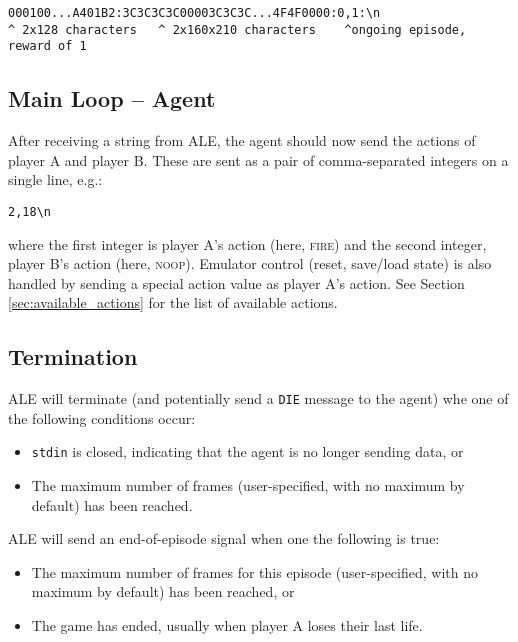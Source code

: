 \documentclass[12pt]{article}
\begin{document}
\begin{verbatim}
000100...A401B2:3C3C3C3C00003C3C3C...4F4F0000:0,1:\n
^ 2x128 characters   ^ 2x160x210 characters    ^ongoing episode, reward of 1
\end{verbatim}

\subsection{Main Loop -- Agent}

After receiving a string from ALE, the agent should now send the actions of player A and player B.
These are sent as a pair of comma-separated integers on a single line, e.g.:

\begin{verbatim}
2,18\n
\end{verbatim}

where the first integer is player A's action (here, \textsc{fire}) and the second integer, player B's action (here, \textsc{noop}). Emulator control (reset, save/load state) is also handled by sending a special action value as player A's action. See Section \ref{sec:available_actions} for the list of available actions.

\subsection{Termination}\label{subsec:termination_conditions}

ALE will terminate (and potentially send a \verb+DIE+ message to the agent) whe one of the following conditions occur:

\begin{itemize}
  \item{\texttt{stdin} is closed, indicating that the agent is no longer sending data, or}
  \item{The maximum number of frames (user-specified, with no maximum by default) has been reached.}
\end{itemize}

ALE will send an end-of-episode signal when one the following is true:

\begin{itemize}
  \item{The maximum number of frames for this episode (user-specified, with no maximum by default) has been reached, or}
  \item{The game has ended, usually when player A loses their last life.}
\end{itemize}
\end{document}
